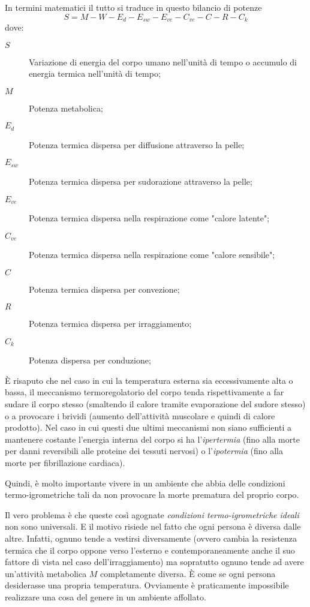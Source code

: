 In termini matematici il tutto si traduce in questo bilancio di potenze
\begin{equation}
	\label{bilanciocorpoumano}
	S=M-W-E_d-E_{sw}-E_{ve}-C_{ve}-C-R-C_k
\end{equation}
dove:
\begin{description}
	\item[$S$]Variazione di energia del corpo umano nell'unità di tempo o accumulo di energia termica nell'unità di tempo;
	\item[$M$]Potenza metabolica;
	\item[$E_d$] Potenza termica dispersa per diffusione attraverso la pelle;
	\item[$E_{sw}$] Potenza termica dispersa per sudorazione attraverso la pelle;
	\item[$E_{ve}$] Potenza termica dispersa nella respirazione come "calore latente";
	\item[$C_{ve}$] Potenza termica dispersa nella respirazione come "calore sensibile";
	\item[$C$] Potenza termica dispersa per convezione;
	\item[$R$] Potenza termica dispersa per irraggiamento;
	\item[$C_k$] Potenza dispersa per conduzione;
\end{description}
È risaputo che nel caso in cui la temperatura esterna sia eccessivamente alta o bassa, il meccanismo termoregolatorio del corpo tenda rispettivamente a far sudare il corpo stesso (smaltendo il calore tramite evaporazione del sudore stesso) o a provocare i brividi (aumento dell'attività muscolare e quindi di calore prodotto). Nel caso in cui questi due ultimi meccanismi non siano sufficienti a mantenere costante l'energia interna del corpo si ha l'\emph{ipertermia} (fino alla morte per danni reversibili alle proteine dei tessuti nervosi) o l'\emph{ipotermia} (fino alla morte per fibrillazione cardiaca).

Quindi, è molto importante vivere in un ambiente che abbia delle condizioni termo-igrometriche tali da non provocare la morte prematura del proprio corpo.

Il vero problema è che queste così agognate \emph{condizioni termo-igrometriche ideali} non sono universali. E il motivo risiede nel fatto che ogni persona è diversa dalle altre. Infatti, ognuno tende a vestirsi diversamente (ovvero cambia la resistenza termica che il corpo oppone verso l'esterno e contemporaneamente anche il suo fattore di vista nel caso dell'irraggiamento) ma sopratutto ognuno tende ad avere un'attività metabolica $M$ completamente diversa. È come se ogni persona desiderasse una propria temperatura. Ovviamente è praticamente impossibile realizzare una cosa del genere in un ambiente affollato.

